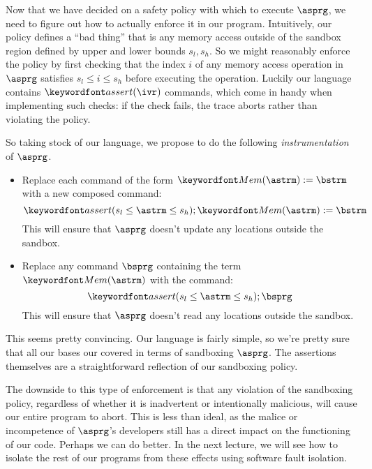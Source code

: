\documentclass[11pt,twoside]{scrartcl}
\begin{document}
Now that we have decided on a safety policy with which to execute $\asprg$, we need to figure out how to actually enforce it in our program. Intuitively, our policy defines a ``bad thing'' that is any memory access outside of the sandbox region defined by upper and lower bounds $s_l, s_h$. So we might reasonably enforce the policy by first checking that the index $i$ of any memory access operation in $\asprg$ satisfies $s_l \le i \le s_h$ before executing the operation. Luckily our language contains $\passert{\ivr}$ commands, which come in handy when implementing such checks: if the check fails, the trace aborts rather than violating the policy.

So taking stock of our language, we propose to do the following \emph{instrumentation} of $\asprg$.
\begin{itemize}
  \item Replace each command of the form $\pderef{\astrm}:=\bstrm$ with a new composed command:
  \[
  \passert{s_l \le \astrm \le s_h}; \pderef{\astrm}:=\bstrm
  \]
  This will ensure that $\asprg$ doesn't update any locations outside the sandbox.

  \item Replace any command $\bsprg$ containing the term $\pderef{\astrm}$ with the command:
  \[
  \passert{s_l \le \astrm \le s_h}; \bsprg
  \]
  This will ensure that $\asprg$ doesn't read any locations outside the sandbox.
\end{itemize}
This seems pretty convincing. Our language is fairly simple, so we're pretty sure that all our bases our covered in terms of sandboxing $\asprg$. The assertions themselves are a straightforward reflection of our sandboxing policy.

The downside to this type of enforcement is that any violation of the sandboxing policy, regardless of whether it is inadvertent or intentionally malicious, will cause our entire program to abort. This is less than ideal, as the malice or incompetence of $\asprg$'s developers still has a direct impact on the functioning of our code. Perhaps we can do better. In the next lecture, we will see how to isolate the rest of our programs from these effects using software fault isolation.



\end{document}
